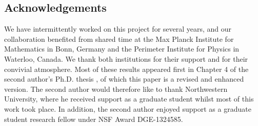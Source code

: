 




\subsection*{Acknowledgements}

We have intermittently worked on this project for several years,
and our collaboration benefited from shared time at the Max Planck Institute for Mathematics in Bonn, Germany and the Perimeter Institute for Physics in Waterloo, Canada.
We thank both institutions for their support and for their convivial atmosphere.
Most of these results appeared first in Chapter 4 of the second author's Ph.D. thesis \cite{BWthesis},
of which this paper is a revised and enhanced version. 
The second author would therefore like to thank Northwestern University, where he received support as a graduate student whilst most of this work took place.
In addition, the second author enjoyed support as a graduate student research fellow under NSF Award DGE-1324585. 

